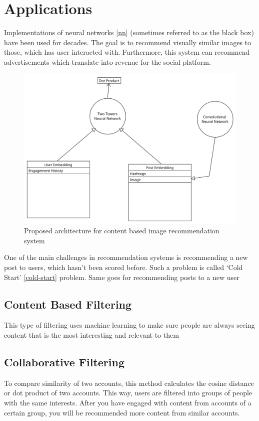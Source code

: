 \section{Applications} \label{applications}

Implementations of neural networks \ref{nn} (sometimes referred to as the black box) have been used for decades. The goal is to recommend visually similar images to those, which has user interacted with. Furthermore, this system can recommend advertisements which translate into revenue for the social platform. 

\begin{figure}[h]
    \centering
    \includegraphics[width=0.7\linewidth]{Diagrams/architecture.pdf}
    \caption{Proposed architecture for content based image recommendation system}
    \label{fig:proposed-alogrithm}
\end{figure}

One of the main challenges in recommendation systems is recommending a new post to users, which hasn't been scored before. Such a problem is called ‘Cold Start' \ref{cold-start} problem. \cite{10373857} Same goes for recommending posts to a new user

\subsection{Content Based Filtering}\label{applications/content-based-filtering}

This type of filtering uses machine learning to make sure people are always seeing content that is the most interesting and relevant to them \cite{ig-new-content}


\subsection{Collaborative Filtering}\label{applications/collaborative-filtering}

To compare similarity of two accounts, this method calculates the cosine distance or dot product of two accounts. \cite{ig-explore} This way, users are filtered into groups of people with the same interests. After you have engaged with content from accounts of a certain group, you will be recommended more content from similar accounts. 